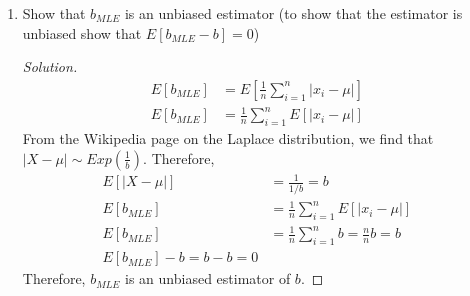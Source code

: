 \documentclass[11pt]{article}
\theoremstyle{quest}
\newenvironment{solution}
  {\begin{mdframed}\begin{proof}[Solution]}
  {\end{proof}\end{mdframed}}
\begin{document}
\begin{enumerate}[label=(\alph*)]
\begin{solution}
\begin{align*}
         \frac{1}{n}\sum_{i=1}^{n} |x_i-\mu| &= b
        \end{align*}
    \end{solution}
    \item Show that $b_{MLE}$ is an unbiased estimator (to show that the estimator is unbiased show that $E[b_{MLE} - b]=0$)
    \begin{solution}
        \begin{align*}
            E[b_{MLE}] &= E[\frac{1}{n}\sum_{i=1}^{n} |x_i-\mu|] &\\
            E[b_{MLE}] &= \frac{1}{n}\sum_{i=1}^{n} E[|x_i-\mu|]
        \end{align*}
        From the Wikipedia page on the Laplace distribution, we find that $|X-\mu| \sim Exp(\frac{1}{b})$. Therefore,
        \begin{align*}
            E[|X-\mu|] &= \frac{1}{1/b} = b &\\
            E[b_{MLE}] &= \frac{1}{n}\sum_{i=1}^{n} E[|x_i-\mu|] &\\
            E[b_{MLE}] &= \frac{1}{n}\sum_{i=1}^{n} b = \frac{n}{n} b = b &\\
            E[b_{MLE}] - b = b - b = 0
        \end{align*}
        Therefore, $b_{MLE}$ is an unbiased estimator of $b$.
    \end{solution}
    \end{enumerate}
    
\end{document}
